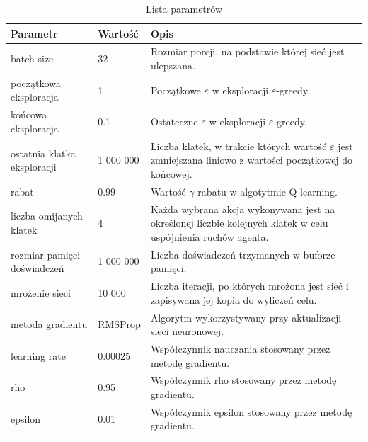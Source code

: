 \documentclass[12pt]{article}
\begin{document}
\begin{center}

\begin{table}[H]
  \centering%
  \caption{Lista parametrów}
\begin{tabular}{|p{3cm}|p{3cm}|p{10cm}|}
\hline
\textbf{Parametr} & \textbf{Wartość} & \textbf{Opis} \\
\hline

batch size &
32 & 
Rozmiar porcji, na podstawie której sieć jest ulepszana. \\
\hline

początkowa eksploracja &
1 &
Początkowe $\varepsilon$ w eksploracji $\varepsilon$-greedy. \\
\hline

końcowa eksploracja &
0.1 &
Ostateczne $\varepsilon$ w eksploracji $\varepsilon$-greedy. \\
\hline

ostatnia klatka eksploracji &
1 000 000 &
Liczba klatek, w trakcie których wartość $\varepsilon$ jest zmniejszana liniowo z wartości początkowej do końcowej.\\
\hline

rabat &
0.99 &
Wartość $\gamma$ rabatu w algotytmie Q-learning.\\
\hline

liczba omijanych klatek &
4 &
Każda wybrana akcja wykonywana jest na określonej liczbie kolejnych klatek w celu uspójnienia ruchów agenta. \\
\hline

rozmiar pamięci doświadczeń &
1 000 000 &
Liczba doświadczeń trzymanych w buforze pamięci.
\\
\hline

mrożenie sieci &
10 000 &
Liczba iteracji, po których mrożona jest sieć i zapisywana jej kopia do wyliczeń celu.  \\
\hline

metoda gradientu &
RMSProp &
Algorytm wykorzystywany przy aktualizacji sieci neuronowej.  \\
\hline

learning rate &
0.00025 &
Współczynnik nauczania stosowany przez metodę gradientu.  \\
\hline

rho &
0.95 &
Współczynnik rho stosowany przez metodę gradientu.  \\
\hline

epsilon &
0.01&
Współczynnik epsilon stosowany przez metodę gradientu.  \\
\hline

\end{tabular}
\end{table}
\end{center}
\end{document}
